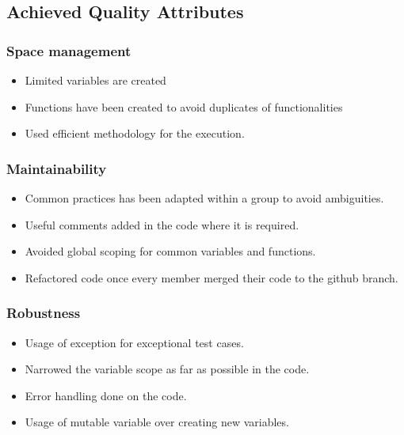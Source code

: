 \documentclass{article}
\begin{document}
\newpage
\subsection{Achieved Quality Attributes}


    \subsubsection{Space management}
        \begin{itemize}
            \item Limited variables are created
            \item Functions have been created to avoid duplicates of functionalities
            \item Used efficient methodology for the execution.
        \end{itemize}
        
    \subsubsection{Maintainability}
        \begin{itemize}
            \item Common practices has been adapted within a group to avoid ambiguities.
            \item Useful comments added in the code where it is required.
            \item Avoided global scoping for common variables and functions.
            \item Refactored code once every member merged their code to the github branch.
        \end{itemize}
    
   
    \subsubsection{Robustness}
        \begin{itemize}
            \item Usage of exception for exceptional test cases.
            \item Narrowed the variable scope as far as possible in the code.
            \item Error handling done on the code.
            \item Usage of mutable variable over creating new variables.
        \end{itemize}
  
    
\end{document}
